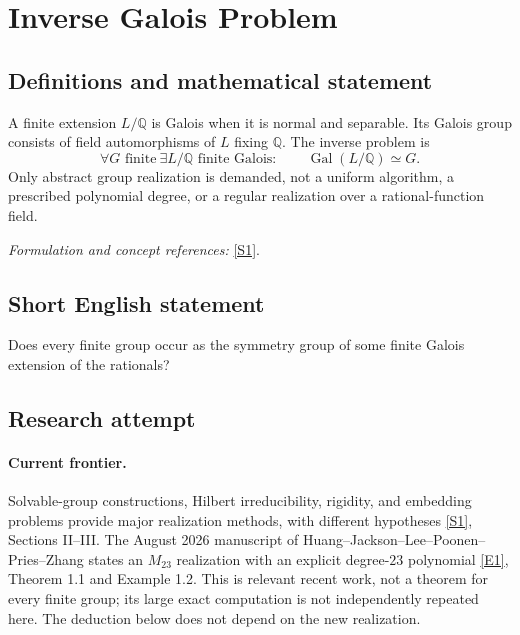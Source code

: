 \documentclass[11pt,a4paper]{article}
\newcommand{\Q}{\mathbb{Q}}
\newcommand{\sref}[2]{\hyperlink{source:#1:#2}{[S#2]}}
\newcommand{\eref}[2]{\hyperlink{extra:#1:#2}{[E#2]}}
\newif\ifshowcatalogue
\newcommand{\cataloguescope}[1]{\ifshowcatalogue
 \paragraph{Exact scope in the supplied catalogue.}
 \begin{quote}\small #1\end{quote}\fi}
\numberwithin{equation}{section}
\begin{document}
\setcounter{section}{0}
\clearpage
\section*{\texorpdfstring{Inverse Galois Problem}{Inverse Galois Problem}}\label{20}
\subsection{Definitions and mathematical statement}
A finite extension $L/\Q$ is Galois when it is normal and separable. Its Galois group consists of field automorphisms of $L$ fixing $\Q$. The inverse problem is
\[
 \forall G\text{ finite}\ \exists L/\Q\text{ finite Galois}:\qquad
 \operatorname{Gal}(L/\Q)\simeq G.
\]
Only abstract group realization is demanded, not a uniform algorithm, a prescribed polynomial degree, or a regular realization over a rational-function field.
\par\smallskip\textit{Formulation and concept references:} \sref{20}{1}.
\cataloguescope{Prove or disprove that every finite group G is isomorphic to the Galois group Gal(L/Q) of some finite Galois extension L of the rational numbers Q.}
\subsection{Short English statement}
Does every finite group occur as the symmetry group of some finite Galois extension of the rationals?
\subsection{Research attempt}

\paragraph{Current frontier.}
Solvable-group constructions, Hilbert irreducibility, rigidity, and embedding problems provide major realization methods, with different hypotheses \sref{20}{1}, Sections II--III. The August 2026 manuscript of Huang--Jackson--Lee--Poonen--Pries--Zhang states an $M_{23}$ realization with an explicit degree-$23$ polynomial \eref{20}{1}, Theorem 1.1 and Example 1.2. This is relevant recent work, not a theorem for every finite group; its large exact computation is not independently repeated here. The deduction below does not depend on the new realization.
\end{document}
